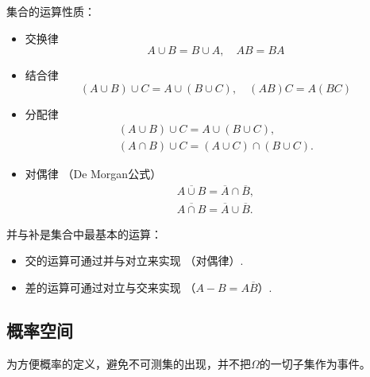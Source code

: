 \begin{property}
    集合的运算性质：
    \begin{itemize}
        \item 交换律
              \begin{equation}\label{eq:commutativity_set}
                  A \cup B = B \cup A, \quad AB = BA
              \end{equation}
        \item 结合律
              \begin{equation}
                  (A \cup B) \cup C = A \cup (B \cup C), \quad (AB)C = A(BC)\label{eq:associative_law_set}
              \end{equation}
        \item 分配律
              \begin{gather}
                  (A \cup B) \cup C = A \cup (B \cup C),\label{eq:distributive_law_set1}\\
                  (A \cap B) \cup C = (A \cup C) \cap (B \cup C).\label{eq:distributive_law_set2}
              \end{gather}
        \item 对偶律 （De Morgan公式）
              \begin{gather}
                  \overline{A \cup B} = \overline{A} \cap \overline{B},\label{eq:DeMorgan_law_set1}\\
                  \overline{A \cap B} = \overline{A} \cup \overline{B}.\label{eq:DeMorgan_law_set2}
              \end{gather}
    \end{itemize}
\end{property}


\begin{remark}
    并与补是集合中最基本的运算：
    \begin{itemize}
        \item 交的运算可通过并与对立来实现 （对偶律）.
        \item 差的运算可通过对立与交来实现 （$A - B = A\overline{B}$）.
    \end{itemize}
\end{remark}

\subsection{概率空间}

为方便概率的定义，避免不可测集的出现，并不把$\Omega$的一切子集作为事件。

